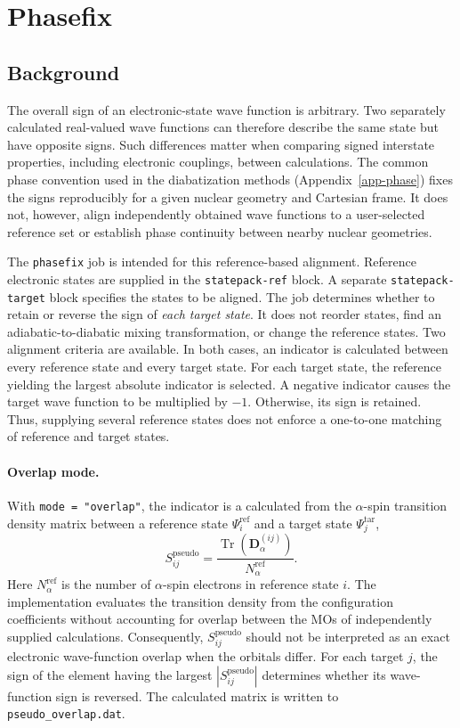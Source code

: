 \section{Phasefix}\label{sec-phasefix}
\subsection{Background}
The overall sign of an electronic-state wave function is arbitrary. Two separately calculated real-valued wave functions can therefore describe the same state but have opposite signs. Such differences matter when comparing signed interstate properties, including electronic couplings, between calculations. The common phase convention used in the diabatization methods (Appendix~\ref{app-phase}) fixes the signs reproducibly for a given nuclear geometry and Cartesian frame. It does not, however, align independently obtained wave functions to a user-selected reference set or establish phase continuity between nearby nuclear geometries.

The \texttt{phasefix} job is intended for this reference-based alignment. Reference electronic states are supplied in the \texttt{statepack-ref} block. A separate \texttt{statepack-target} block specifies the states to be aligned. The job determines whether to retain or reverse the sign of \emph{each target state}. It does not reorder states, find an adiabatic-to-diabatic mixing transformation, or change the reference states. Two alignment criteria are available. In both cases, an indicator is calculated between every reference state and every target state. For each target state, the reference yielding the largest absolute indicator is selected. A negative indicator causes the target wave function to be multiplied by $-1$. Otherwise, its sign is retained. Thus, supplying several reference states does not enforce a one-to-one matching of reference and target states.

\paragraph{Overlap mode.}
With \texttt{mode = "overlap"}, the indicator is a  calculated from the $\alpha$-spin transition density matrix between a reference state $\Psi_i^{\mathrm{ref}}$ and a target state $\Psi_j^{\mathrm{tar}}$,
\begin{equation}
  S_{ij}^{\mathrm{pseudo}} = \frac{\operatorname{Tr}\!\left(\mathbf D_{\alpha}^{(ij)}\right)}{N_{\alpha}^{\mathrm{ref}}}.
\end{equation}
Here $N_{\alpha}^{\mathrm{ref}}$ is the number of $\alpha$-spin electrons in reference state $i$. The implementation evaluates the transition density from the configuration coefficients without accounting for overlap between the MOs of independently supplied calculations. Consequently, $S_{ij}^{\mathrm{pseudo}}$ should not be interpreted as an exact electronic wave-function overlap when the orbitals differ. For each target $j$, the sign of the element having the largest $|S_{ij}^{\mathrm{pseudo}}|$ determines whether its wave-function sign is reversed. The calculated matrix is written to \texttt{pseudo\_overlap.dat}.

